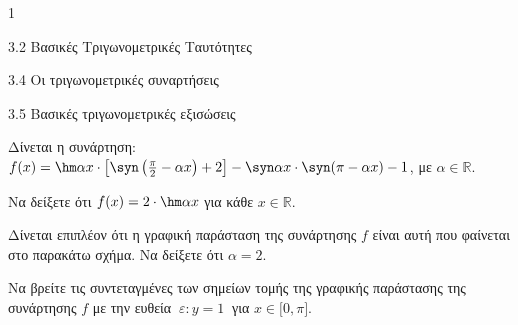 \begin{ylh}{1}
\item 3.2 Βασικές Τριγωνομετρικές Ταυτότητες
\item 3.4 Οι τριγωνομετρικές συναρτήσεις
\item 3.5 Βασικές τριγωνομετρικές εξισώσεις
\end{ylh}
Δίνεται η συνάρτηση:
$f(x) = \hm \alpha x \cdot \left\lbrack \syn \left( \frac{\pi}{2} - \alpha x \right) + 2 \right\rbrack - \syn \alpha x \cdot \syn (\pi - \alpha x) - 1$, με $\alpha\mathbb{\in R}$.
\begin{alist}
\item Να δείξετε ότι $f(x) = 2 \cdot \hm \alpha x$ για κάθε $x\mathbb{\in R}$.
\item Δίνεται επιπλέον ότι η γραφική παράσταση της συνάρτησης $f$ είναι αυτή που φαίνεται στο παρακάτω σχήμα. Να δείξετε ότι $\alpha = 2$.
\begin{center}
\end{center}
\item Να βρείτε τις συντεταγμένες των σημείων τομής της γραφικής παράστασης της συνάρτησης $f$ με την ευθεία $\ \varepsilon:y = 1\ $ για $x \in \lbrack 0,\pi\rbrack$.
\end{alist}

